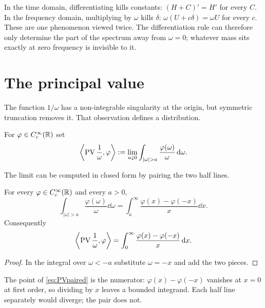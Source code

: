 \begin{remark}
In the time domain, differentiating kills constants: $(H+C)'=H'$ for every $C$. In the frequency
domain, multiplying by $\omega$ kills $\delta$: $\omega(U+c\delta)=\omega U$ for every $c$. These are
one phenomenon viewed twice. The differentiation rule can therefore only determine the part of the
spectrum away from $\omega=0$; whatever mass sits exactly at zero frequency is invisible to it.
\end{remark}

\section{The principal value}

The function $1/\omega$ has a non-integrable singularity at the origin, but symmetric truncation
removes it. That observation defines a distribution.

\begin{definition}\label{def:PV}
For $\varphi\in C_{c}^{\infty}(\mathbb{R})$ set
\begin{equation}
\left\langle\PV\frac{1}{\omega},\varphi\right\rangle
:=\lim_{a\downarrow0}\int_{|\omega|>a}\frac{\varphi(\omega)}{\omega}\dd\omega .
\label{eq:PVdef}
\end{equation}
\end{definition}

The limit can be computed in closed form by pairing the two half lines.

\begin{lemma}\label{lem:PVform}
For every $\varphi\in C_{c}^{\infty}(\mathbb{R})$ and every $a>0$,
\begin{equation}
\int_{|\omega|>a}\frac{\varphi(\omega)}{\omega}\dd\omega
=\int_{a}^{\infty}\frac{\varphi(x)-\varphi(-x)}{x}\dd x .
\label{eq:PVpaired}
\end{equation}
Consequently
\begin{equation}
\left\langle\operatorname{PV}\frac{1}{\omega},\varphi\right\rangle
=\int_{0}^{\infty}\frac{\varphi(x)-\varphi(-x)}{x}\,\mathrm{d} x .
\label{eq:PVint}
\end{equation}
\end{lemma}

\begin{proof}
In the integral over $\omega<-a$ substitute $\omega=-x$ and add the two pieces.
\end{proof}

The point of \eqref{eq:PVpaired} is the numerator: $\varphi(x)-\varphi(-x)$ vanishes at $x=0$ at
first order, so dividing by $x$ leaves a bounded integrand. Each half line separately would
diverge; the pair does not.

